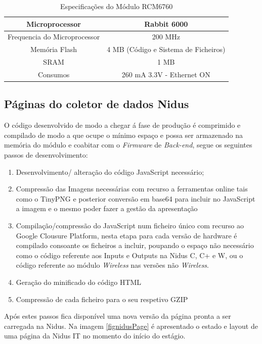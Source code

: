 \begin{table}[htb]
\centering
\caption{Especificações do Módulo RCM6760}\label{tab0}
\begin{tabular}{|c|c|}\hline
Microprocessor&Rabbit 6000 \\\hline
Frequencia do Microprocessor &200 MHz\\\hline
Memória Flash &4 MB (Código e Sistema de Ficheiros)\\\hline
SRAM&1 MB\\\hline
Consumos &260 mA 3.3V - Ethernet ON\\\hline
\end{tabular} 
\end{table}

\subsection{Páginas do coletor de dados Nidus} \label{Página do Coletor de Dados Nidus}
\par
O código desenvolvido de modo a chegar á fase de produção é comprimido e compilado de modo a que ocupe o mínimo espaço e possa ser armazenado na memória do módulo e coabitar com o \textit{Firmware} de \textit{Back-end}, segue os seguintes passos de desenvolvimento:
\begin{enumerate}
\item Desenvolvimento/ alteração do código JavaScript necessário; 
\item Compressão das Imagens necessárias com recurso a ferramentas online tais como o TinyPNG\cite{tinypng} e posterior conversão em base64 para incluir no JavaScript a imagem e o mesmo poder fazer a gestão da apresentação
\item Compilação/compressão do JavaScript num ficheiro único com recurso ao Google Clousure Platform, nesta etapa para cada versão de hardware é compilado consoante os ficheiros a incluir, poupando o espaço não necessário como o código referente aos Inputs e Outputs na Nidus C, C+ e W, ou o código referente ao módulo \textit{Wireless} nas versões não \textit{Wireless}.
\item Geração do minificado do código HTML
\item Compressão de cada ficheiro para o seu respetivo GZIP
\end{enumerate}
\par
Após estes passos fica disponível uma nova versão da página pronta a ser carregada na Nidus.
Na imagem \ref{fignidusPage} é apresentado o estado e layout de uma página da Nidus IT no momento do início do estágio.

